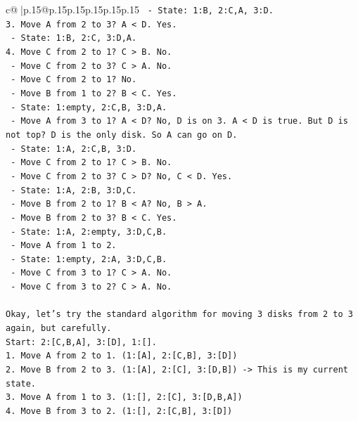 \documentclass{article}
\begin{document}
{\begin{supertabular}{c@{$\;$}|p{.15\linewidth}@{}p{.15\linewidth}p{.15\linewidth}p{.15\linewidth}p{.15\linewidth}p{.15\linewidth}}
{{{\texttt{   {-} State: 1:B, 2:C,A, 3:D.} \\
\texttt{3. Move A from 2 to 3? A < D. Yes.} \\
\texttt{   {-} State: 1:B, 2:C, 3:D,A.} \\
\texttt{4. Move C from 2 to 1? C > B. No.} \\
\texttt{   {-} Move C from 2 to 3? C > A. No.} \\
\texttt{   {-} Move C from 2 to 1? No.} \\
\texttt{   {-} Move B from 1 to 2? B < C. Yes.} \\
\texttt{   {-} State: 1:empty, 2:C,B, 3:D,A.} \\
\texttt{   {-} Move A from 3 to 1? A < D? No, D is on 3. A < D is true. But D is not top? D is the only disk. So A can go on D.} \\
\texttt{   {-} State: 1:A, 2:C,B, 3:D.} \\
\texttt{   {-} Move C from 2 to 1? C > B. No.} \\
\texttt{   {-} Move C from 2 to 3? C > D? No, C < D. Yes.} \\
\texttt{   {-} State: 1:A, 2:B, 3:D,C.} \\
\texttt{   {-} Move B from 2 to 1? B < A? No, B > A.} \\
\texttt{   {-} Move B from 2 to 3? B < C. Yes.} \\
\texttt{   {-} State: 1:A, 2:empty, 3:D,C,B.} \\
\texttt{   {-} Move A from 1 to 2.} \\
\texttt{   {-} State: 1:empty, 2:A, 3:D,C,B.} \\
\texttt{   {-} Move C from 3 to 1? C > A. No.} \\
\texttt{   {-} Move C from 3 to 2? C > A. No.} \\
\\ 
\texttt{Okay, let's try the standard algorithm for moving 3 disks from 2 to 3 again, but carefully.} \\
\texttt{Start: 2:{[}C,B,A{]}, 3:{[}D{]}, 1:{[}{]}.} \\
\texttt{1. Move A from 2 to 1. (1:{[}A{]}, 2:{[}C,B{]}, 3:{[}D{]})} \\
\texttt{2. Move B from 2 to 3. (1:{[}A{]}, 2:{[}C{]}, 3:{[}D,B{]}) {-}> This is my current state.} \\
\texttt{3. Move A from 1 to 3. (1:{[}{]}, 2:{[}C{]}, 3:{[}D,B,A{]})} \\
\texttt{4. Move B from 3 to 2. (1:{[}{]}, 2:{[}C,B{]}, 3:{[}D{]})} \\
}}}
\end{supertabular}}
\end{document}
